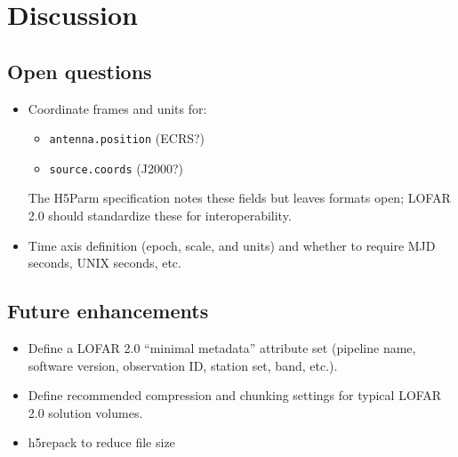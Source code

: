 \documentclass[a4paper,10pt,bibtotoc]{scrartcl}
\begin{document}




\section{Discussion}
\label{sec:discussion}

\subsection{Open questions}
\label{sec:open-questions}
\begin{itemize}
  \item Coordinate frames and units for:
    \begin{itemize}
      \item \texttt{antenna.position} (ECRS?)
      \item \texttt{source.coords} (J2000?)
    \end{itemize}
    The H5Parm specification notes these fields but leaves formats open; LOFAR 2.0 should standardize these for interoperability. 
  \item Time axis definition (epoch, scale, and units) and whether to require MJD seconds, UNIX seconds, etc.
\end{itemize}

\subsection{Future enhancements}
\label{sec:future-enhancements}
\begin{itemize}
  \item Define a LOFAR 2.0 ``minimal metadata'' attribute set (pipeline name, software version, observation ID, station set, band, etc.).
  \item Define recommended compression and chunking settings for typical LOFAR 2.0 solution volumes.
  \item h5repack to reduce file size
\end{itemize}
\end{document}
